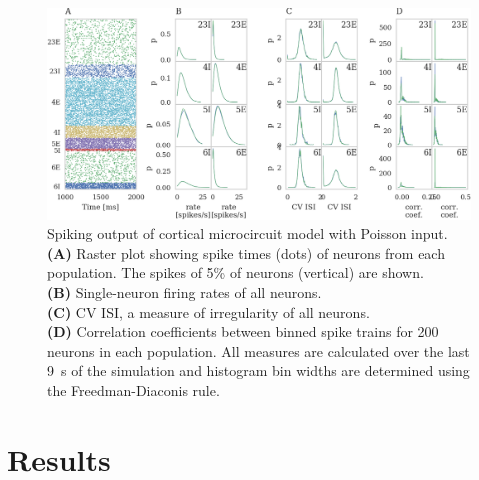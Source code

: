 \documentclass[utf8]{frontiersSCNS} %
\begin{document}
\begin{figure}
    \begin{center}
        \includegraphics[width=180mm]{figures/microcircuit_accuracy}
    \end{center}
    \caption{Spiking output of cortical microcircuit model with Poisson input.\\
    \textbf{(A)} Raster plot showing spike times (dots) of neurons from each population.
    The spikes of 5\% of neurons (vertical) are shown.\\
    \textbf{(B)} Single-neuron firing rates of all neurons.\\
    \textbf{(C)} CV ISI, a measure of irregularity of all neurons.\\
    \textbf{(D)} Correlation coefficients between binned spike trains for \num{200} neurons in each population.
    All measures are calculated over the last \SI{9}{\second} of the simulation and histogram bin widths are determined using the Freedman-Diaconis rule.}
    \label{fig:microcircuit_accuracy}
\end{figure}

\section{Results}
\end{document}
